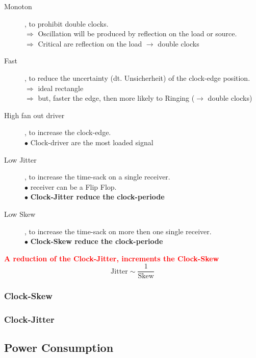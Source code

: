 \begin{description}
	\item[Monoton], to prohibit double clocks. \\
		$\Rightarrow$ Oscillation will be produced by reflection on the load or source. \\
		$\Rightarrow$ Critical are reflection on the load $\rightarrow$ double clocks
		
	\item[Fast], to reduce the uncertainty (dt. Unsicherheit) of the clock-edge position. \\
		$\Rightarrow$ ideal rectangle \\
		$\Rightarrow$ but, faster the edge, then more likely to Ringing ($\rightarrow$ double clocks) 
	
	\item[High fan out driver], to increase the clock-edge. \\
		$\bullet$ Clock-driver are the most loaded signal
		
	\item[Low Jitter], to increase the time-sack on a single receiver. \\
	    $\bullet$ receiver can be a Flip Flop. \\
		$\bullet$ \textbf{Clock-Jitter reduce the clock-periode}
		
	\item[Low Skew], to increase the time-sack on more then one single receiver. \\
		$\bullet$ \textbf{Clock-Skew reduce the clock-periode}
\end{description}

\textbf{\textcolor{red}{A reduction of the Clock-Jitter, increments the Clock-Skew}}
\begin{equation*}
	\boxed{
	\text{Jitter} \sim \frac{1}{\text{Skew}}
	}
\end{equation*} 

\subsubsection{Clock-Skew}

\subsubsection{Clock-Jitter}

\subsection{Power Consumption}

